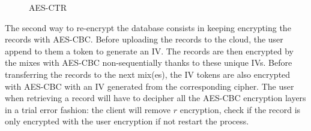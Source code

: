 \documentclass{llncs}
\begin{document}
\begin{figure}[h]
\centering
\begin{adjustbox}{width=\textwidth}
\centering 
{}
\end{adjustbox}
\caption{AES-CTR} \label{fig:AES}
\end{figure}
%
The second way to re-encrypt the database consists in keeping encrypting the records with AES-CBC. Before uploading the records to the cloud, the user append to them a token to generate an IV. The records are then encrypted by the mixes with AES-CBC non-sequentially thanks to these unique IVs. Before transferring the records to the next mix(es), the IV tokens are also encrypted with AES-CBC with an IV generated from the corresponding cipher.
The user when retrieving a record will have to decipher all the AES-CBC encryption layers in a trial error fashion: the client will remove $r$ encryption, check if the record is only encrypted with the user encryption if not restart the process.\\
\end{document}
